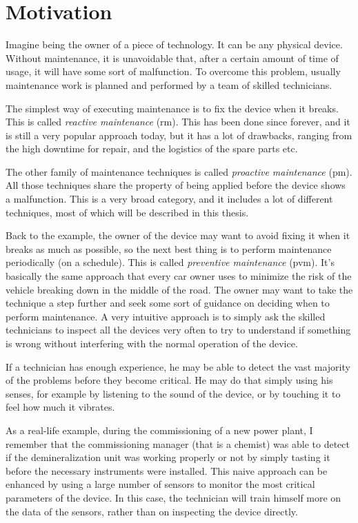 \section{Motivation}
\label{sec:motivation}
Imagine being the owner of a piece of technology. It can be any physical device. Without maintenance, it is unavoidable that, after a certain amount of time of usage, it will have some sort of malfunction.
To overcome this problem, usually maintenance work is planned and performed by a team of skilled technicians. 

The simplest way of executing maintenance is to fix the device when it breaks. This is called \emph{reactive maintenance} (\gls{rm}). This has been done since forever, and it is still a very popular approach today, but it has a lot of drawbacks, ranging from the high downtime for repair, and the logistics of the spare parts etc.

The other family of maintenance techniques is called \emph{proactive maintenance} (\gls{pm}). All those techniques share the property of being applied before the device shows a malfunction. This is a very broad category, and it includes a lot of different techniques, most of which will be described in this thesis.

Back to the example, the owner of the device may want to avoid fixing it when it breaks as much as possible, so the next best thing is to perform maintenance periodically (on a schedule). This is called \emph{preventive maintenance} (\gls{pvm}). It's basically the same approach that every car owner uses to minimize the risk of the vehicle breaking down in the middle of the road. 
The owner may want to take the technique a step further and seek some sort of guidance on deciding when to perform maintenance. A very intuitive approach is to simply ask the skilled technicians to inspect all the devices very often to try to understand if something is wrong without interfering with the normal operation of the device.

If a technician has enough experience, he may be able to detect the vast majority of the problems before they become critical. He may do that simply using his senses, for example by listening to the sound of the device, or by touching it to feel how much it vibrates. 

As a real-life example, during the commissioning of a new power plant, I remember that the commissioning manager (that is a chemist) was able to detect if the demineralization unit was working properly or not by simply tasting it before the necessary instruments were installed.
This naive approach can be enhanced by using a large number of sensors to monitor the most critical parameters of the device. In this case, the technician will train himself more on the data of the sensors, rather than on inspecting the device directly. 

